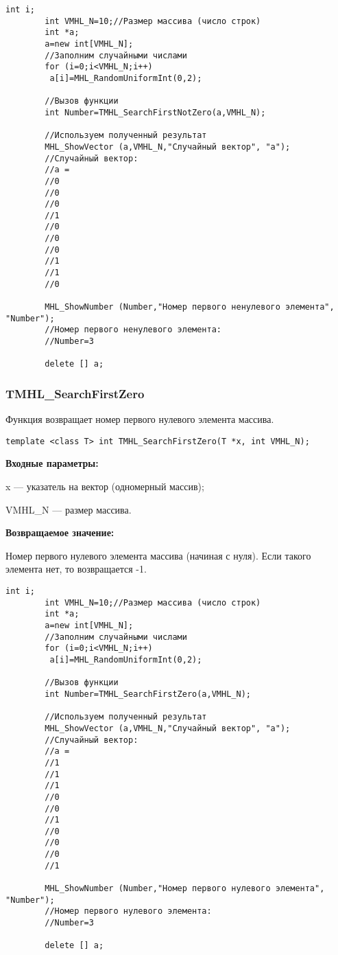 \documentclass[a4paper,12pt]{article}
\begin{document}
\begin{lstlisting}[label=code_use_TMHL_SearchFirstNotZero,caption=Пример использования]
        int i;
        int VMHL_N=10;//Размер массива (число строк)
        int *a;
        a=new int[VMHL_N];
        //Заполним случайными числами
        for (i=0;i<VMHL_N;i++)
         a[i]=MHL_RandomUniformInt(0,2);

        //Вызов функции
        int Number=TMHL_SearchFirstNotZero(a,VMHL_N);

        //Используем полученный результат
        MHL_ShowVector (a,VMHL_N,"Случайный вектор", "a");
        //Случайный вектор:
        //a =
        //0
        //0
        //0
        //1
        //0
        //0
        //0
        //1
        //1
        //0

        MHL_ShowNumber (Number,"Номер первого ненулевого элемента", "Number");
        //Номер первого ненулевого элемента:
        //Number=3

        delete [] a;
\end{lstlisting}

\subsubsection{TMHL\_SearchFirstZero}\label{TMHL_SearchFirstZero}

Функция возвращает номер первого нулевого элемента массива.


\begin{lstlisting}[label=code_syntax_TMHL_SearchFirstZero,caption=Синтаксис]
template <class T> int TMHL_SearchFirstZero(T *x, int VMHL_N);
\end{lstlisting}

\textbf{Входные параметры:}

 x --- указатель на вектор (одномерный массив);
 
 VMHL\_N --- размер массива.

\textbf{Возвращаемое значение:}

 Номер первого нулевого элемента массива (начиная с нуля). Если такого элемента нет, то возвращается -1.


\begin{lstlisting}[label=code_use_TMHL_SearchFirstZero,caption=Пример использования]
        int i;
        int VMHL_N=10;//Размер массива (число строк)
        int *a;
        a=new int[VMHL_N];
        //Заполним случайными числами
        for (i=0;i<VMHL_N;i++)
         a[i]=MHL_RandomUniformInt(0,2);

        //Вызов функции
        int Number=TMHL_SearchFirstZero(a,VMHL_N);

        //Используем полученный результат
        MHL_ShowVector (a,VMHL_N,"Случайный вектор", "a");
        //Случайный вектор:
        //a =
        //1
        //1
        //1
        //0
        //0
        //1
        //0
        //0
        //0
        //1

        MHL_ShowNumber (Number,"Номер первого нулевого элемента", "Number");
        //Номер первого нулевого элемента:
        //Number=3

        delete [] a;
\end{lstlisting}
\end{document}
